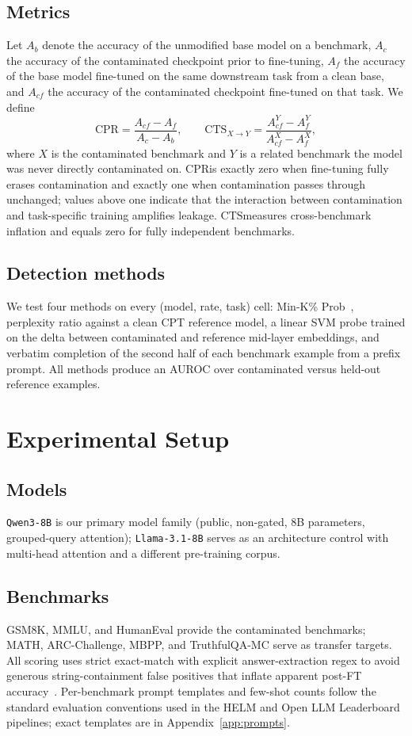 \documentclass{article}
\newcommand{\cpr}{\ensuremath{\mathrm{CPR}}}
\newcommand{\cts}{\ensuremath{\mathrm{CTS}}}
\begin{document}
\subsection{Metrics}
Let $A_b$ denote the accuracy of the unmodified base model on a benchmark, $A_c$ the accuracy of the contaminated checkpoint prior to fine-tuning, $A_f$ the accuracy of the base model fine-tuned on the same downstream task from a clean base, and $A_{cf}$ the accuracy of the contaminated checkpoint fine-tuned on that task. We define
\[
  \cpr = \frac{A_{cf} - A_f}{A_c - A_b}, \qquad
  \cts_{X \to Y} = \frac{A^Y_{cf} - A^Y_f}{A^X_{cf} - A^X_f},
\]
where $X$ is the contaminated benchmark and $Y$ is a related benchmark the model was never directly contaminated on. \cpr is exactly zero when fine-tuning fully erases contamination and exactly one when contamination passes through unchanged; values above one indicate that the interaction between contamination and task-specific training amplifies leakage. \cts measures cross-benchmark inflation and equals zero for fully independent benchmarks.

\subsection{Detection methods}
We test four methods on every (model, rate, task) cell: Min-K\% Prob~\citep{shi2024detecting}, perplexity ratio against a clean CPT reference model, a linear SVM probe trained on the delta between contaminated and reference mid-layer embeddings, and verbatim completion of the second half of each benchmark example from a prefix prompt. All methods produce an AUROC over contaminated versus held-out reference examples.

\section{Experimental Setup}
\label{sec:setup}

\subsection{Models}
\texttt{Qwen3-8B} is our primary model family (public, non-gated, 8B parameters, grouped-query attention); \texttt{Llama-3.1-8B} serves as an architecture control with multi-head attention and a different pre-training corpus.

\subsection{Benchmarks}
GSM8K, MMLU, and HumanEval provide the contaminated benchmarks; MATH, ARC-Challenge, MBPP, and TruthfulQA-MC serve as transfer targets. All scoring uses strict exact-match with explicit answer-extraction regex to avoid generous string-containment false positives that inflate apparent post-FT accuracy~\citep{wang2024mmlupro}. Per-benchmark prompt templates and few-shot counts follow the standard evaluation conventions used in the HELM and Open LLM Leaderboard pipelines; exact templates are in Appendix~\ref{app:prompts}.
\end{document}

